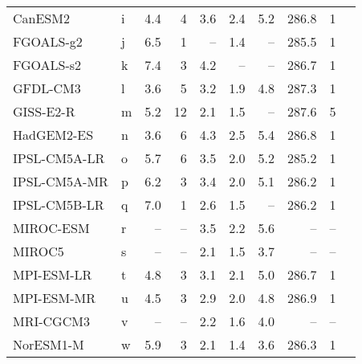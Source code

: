 \begin{table}
\begin{tabular}{llrrrrrrrl}
CanESM2       &   i &   4.4 &                       4 &  3.6 &  2.4 &   5.2 &  286.8 &                      1 &     \citet{gregory15tcr} \\
FGOALS-g2     &   j &   6.5 &                       1 &   -- &  1.4 &    -- &  285.5 &                      1 &  \citet{stocker2013ipcc} \\
FGOALS-s2     &   k &   7.4 &                       3 &  4.2 &   -- &    -- &  286.7 &                      1 &  \citet{Zelinka2020sens} \\
GFDL-CM3      &   l &   3.6 &                       5 &  3.2 &  1.9 &   4.8 &  287.3 &                      1 &     \citet{gregory15tcr} \\
GISS-E2-R     &   m &   5.2 &                      12 &  2.1 &  1.5 &    -- &  287.6 &                      5 &  \citet{stocker2013ipcc} \\
HadGEM2-ES    &   n &   3.6 &                       6 &  4.3 &  2.5 &   5.4 &  286.8 &                      1 &     \citet{gregory15tcr} \\
IPSL-CM5A-LR  &   o &   5.7 &                       6 &  3.5 &  2.0 &   5.2 &  285.2 &                      1 &     \citet{gregory15tcr} \\
IPSL-CM5A-MR  &   p &   6.2 &                       3 &  3.4 &  2.0 &   5.1 &  286.2 &                      1 &     \citet{gregory15tcr} \\
IPSL-CM5B-LR  &   q &   7.0 &                       1 &  2.6 &  1.5 &    -- &  286.2 &                      1 &  \citet{stocker2013ipcc} \\
MIROC-ESM     &   r &    -- &                    -- &  3.5 &  2.2 &   5.6 &     -- &                   -- &     \citet{gregory15tcr} \\
MIROC5        &   s &    -- &                    -- &  2.1 &  1.5 &   3.7 &     -- &                   -- &     \citet{gregory15tcr} \\
MPI-ESM-LR    &   t &   4.8 &                       3 &  3.1 &  2.1 &   5.0 &  286.7 &                      1 &     \citet{gregory15tcr} \\
MPI-ESM-MR    &   u &   4.5 &                       3 &  2.9 &  2.0 &   4.8 &  286.9 &                      1 &     \citet{gregory15tcr} \\
MRI-CGCM3     &   v &    -- &                    -- &  2.2 &  1.6 &   4.0 &     -- &                   -- &     \citet{gregory15tcr} \\
NorESM1-M     &   w &   5.9 &                       3 &  2.1 &  1.4 &   3.6 &  286.3 &                      1 &     \citet{gregory15tcr} \\

\end{tabular}
\end{table}

